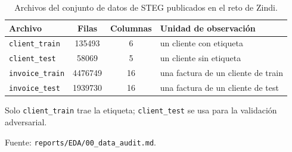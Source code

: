 \begin{table}[htbp]
  \centering
  \small
  \caption{Archivos del conjunto de datos de STEG publicados en el reto de Zindi.}
  \label{tab:datos}
  \begin{threeparttable}
    \begin{tabular}{l S[table-format=7.0] S[table-format=2.0] l}
      \toprule
      {Archivo} & {Filas} & {Columnas} & {Unidad de observación} \\
      \midrule
      \texttt{client\_train} & 135493 & 6 & un cliente con etiqueta \\
      \texttt{client\_test} & 58069 & 5 & un cliente sin etiqueta \\
      \texttt{invoice\_train} & 4476749 & 16 & una factura de un cliente de train \\
      \texttt{invoice\_test} & 1939730 & 16 & una factura de un cliente de test \\
      \bottomrule
    \end{tabular}
    \begin{tablenotes}
      \footnotesize
      \item Solo \texttt{client\_train} trae la etiqueta; \texttt{client\_test} se usa para la validación adversarial.
      \item Fuente: \texttt{reports/EDA/00\_data\_audit.md}.
    \end{tablenotes}
  \end{threeparttable}
\end{table}
